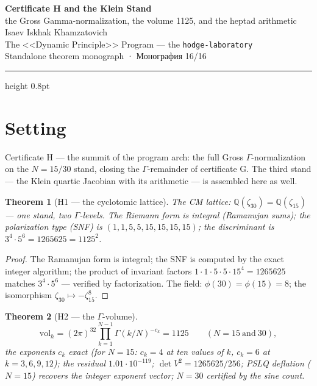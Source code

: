 \documentclass[11pt,a4paper]{article}
\theoremstyle{plain}
\newtheorem{theorem}{Theorem}
\theoremstyle{definition}
\theoremstyle{remark}
\newcommand{\QQ}{\mathbb{Q}}
\newcommand{\Ga}{\Gamma}
\begin{document}
\begin{center}
{\LARGE\bfseries Certificate H and the Klein Stand}\\[0.4em]
{\large the Gross Gamma-normalization, the volume 1125, and the heptad arithmetic}\\[0.6em]
{\normalsize Isaev Iskhak Khamzatovich}\\[0.2em]
{\normalsize The <<Dynamic Principle>> Program --- the \texttt{hodge-laboratory}}\\[0.15em]
{\small Standalone theorem monograph · Монография 16/16}
\end{center}
\vspace{0.4em}
{\color{linkblue}\hrule height 0.8pt}
\vspace{0.8em}

\section{Setting}

Certificate H --- the summit of the program arch: the full Gross
$\Ga$-normalization on the $N=15/30$ stand, closing the
$\Ga$-remainder of certificate G. The third stand --- the Klein
quartic Jacobian with its arithmetic --- is assembled here as well.

\begin{theorem}[H1 --- the cyclotomic lattice]\label{th:H1stand}
The CM lattice: $\QQ(\zeta_{30})=\QQ(\zeta_{15})$ --- one stand,
two $\Ga$-levels. The Riemann form is integral (Ramanujan sums);
the polarization type (SNF) is $(1,1,5,5,15,15,15,15)$; the
discriminant is $3^4\cdot5^6=1265625=1125^2$.
\end{theorem}

\begin{proof}
The Ramanujan form is integral; the SNF is computed by the exact
integer algorithm; the product of invariant factors
$1\cdot1\cdot5\cdot5\cdot15^4=1265625$ matches $3^4\cdot5^6$ ---
verified by factorization. The field: $\phi(30)=\phi(15)=8$; the
isomorphism $\zeta_{30}\mapsto-\zeta_{15}^8$.
\end{proof}

\begin{theorem}[H2 --- the $\Ga$-volume]\label{th:H2stand}
\[
  \mathrm{vol}_h=(2\pi)^{32}\prod_{k=1}^{N-1}\Ga(k/N)^{-c_k}=1125
  \qquad (N=15\ \text{and}\ 30),
\]
the exponents $c_k$ exact (for $N=15$: $c_k=4$ at ten values of $k$,
$c_k=6$ at $k=3,6,9,12$); the residual $1.01\cdot10^{-119}$;
$\det V^2=1265625/256$; PSLQ deflation ($N=15$) recovers the integer
exponent vector; $N=30$ certified by the sine count.
\end{theorem}
\end{document}
